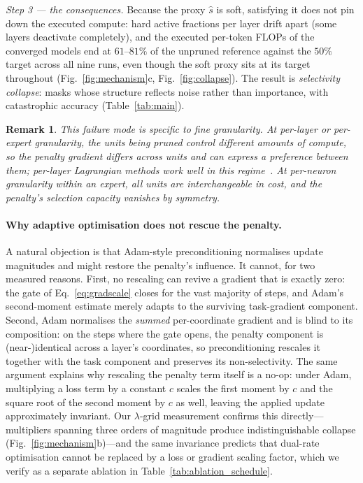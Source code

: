 \documentclass[fleqn,10pt]{article}
\newtheorem{remark}{Remark}
\begin{document}
\emph{Step 3 --- the consequences.} Because the proxy $\hat{s}$ is
soft, satisfying it does not pin down the executed compute: hard
active fractions per layer drift apart (some layers deactivate
completely), and the executed per-token FLOPs of the converged
models end at $61$--$81\%$ of the unpruned reference against the
$50\%$ target across all nine runs, even though the soft proxy sits
at its target throughout (Fig.~\ref{fig:mechanism}c,
Fig.~\ref{fig:collapse}). The result is \emph{selectivity collapse}:
masks whose structure reflects noise rather than importance, with
catastrophic accuracy (Table~\ref{tab:main}).

\begin{remark}
This failure mode is specific to fine granularity. At per-layer or
per-expert granularity, the units being pruned control
\emph{different} amounts of compute, so the penalty gradient differs
across units and can express a preference between them; per-layer
Lagrangian methods work well in this
regime~\citep{gordon2018morphnet}. At per-neuron granularity within
an expert, all units are interchangeable in cost, and the penalty's
selection capacity vanishes by symmetry.
\end{remark}

\paragraph{Why adaptive optimisation does not rescue the penalty.}
A natural objection is that Adam-style preconditioning normalises
update magnitudes and might restore the penalty's influence. It
cannot, for two measured reasons. First, no rescaling can revive a
gradient that is exactly zero: the gate of Eq.~\ref{eq:gradscale}
closes for the vast majority of steps, and Adam's second-moment
estimate merely adapts to the surviving task-gradient component.
Second, Adam normalises the \emph{summed} per-coordinate gradient
and is blind to its composition: on the steps where the gate opens,
the penalty component is (near-)identical across a layer's
coordinates, so preconditioning rescales it together with the task
component and preserves its non-selectivity. The same argument
explains why rescaling the penalty term itself is a no-op: under
Adam, multiplying a loss term by a constant $c$ scales the first
moment by $c$ and the square root of the second moment by $c$ as
well, leaving the applied update approximately invariant. Our
$\lambda$-grid measurement confirms this directly---multipliers
spanning three orders of magnitude produce indistinguishable
collapse (Fig.~\ref{fig:mechanism}b)---and the same invariance
predicts that dual-rate optimisation cannot be replaced by a loss
or gradient scaling factor, which we verify as a separate ablation
in Table~\ref{tab:ablation_schedule}.
\end{document}
